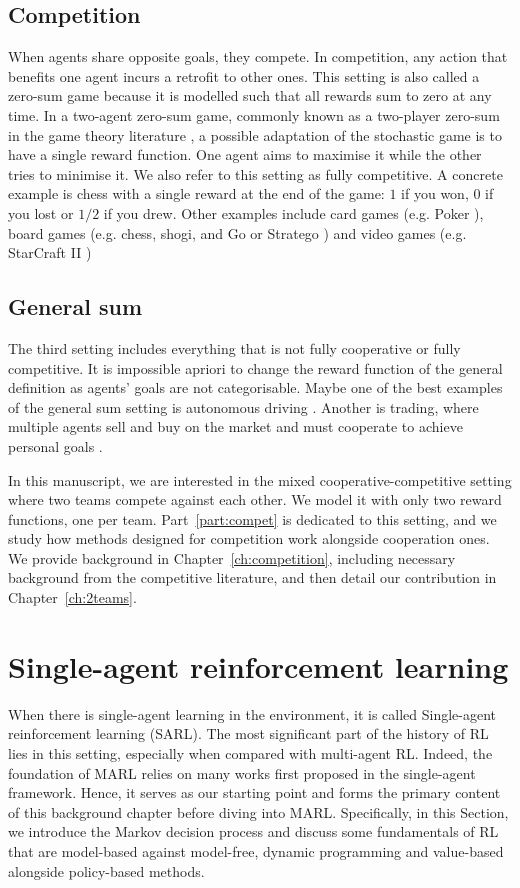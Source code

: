 \subsection{Competition} 
\label{sec:ch2_Competition}
When agents share opposite goals, they compete.
In competition, any action that benefits one agent incurs a retrofit to other ones.
This setting is also called a zero-sum game \citep{marl-book} because it is modelled such that all rewards sum to zero at any time.
In a two-agent zero-sum game, commonly known as a two-player zero-sum in the game theory literature \citep{russel2010}, a possible adaptation of the stochastic game is to have a single reward function.
One agent aims to maximise it while the other tries to minimise it.
We also refer to this setting as fully competitive.
A concrete example is chess with a single reward at the end of the game: $1$ if you won, $0$ if you lost or $1/2$ if you drew.
Other examples include card games (e.g. Poker \citep{poker}), board games (e.g. chess, shogi, and Go \citep{silver2018general} or Stratego \citep{stratego}) and video games (e.g. StarCraft II \citep{vinyals2019grandmaster})


\subsection{General sum} 
\label{sec:ch2_general_sum}
The third setting includes everything that is not fully cooperative or fully competitive.
It is impossible apriori to change the reward function of the general definition as agents' goals are not categorisable.
Maybe one of the best examples of the general sum setting is autonomous driving \citep{dinneweth2022multi}.
Another is trading, where multiple agents sell and buy on the market and must cooperate to achieve personal goals \citep{SHAVANDI2022118124}.

In this manuscript, we are interested in the mixed cooperative-competitive setting where two teams compete against each other.
We model it with only two reward functions, one per team.
Part~\ref{part:compet} is dedicated to this setting, and we study how methods designed for competition work alongside cooperation ones.
We provide background in Chapter~\ref{ch:competition}, including necessary background from the competitive literature, and then detail our contribution in Chapter~\ref{ch:2teams}.

\section{Single-agent reinforcement learning} 
\label{sec:ch2_single_agent_RL}
When there is single-agent learning in the environment, it is called Single-agent reinforcement learning (SARL).
The most significant part of the history of RL lies in this setting, especially when compared with multi-agent RL.
Indeed, the foundation of MARL relies on many works first proposed in the single-agent framework.
Hence, it serves as our starting point and forms the primary content of this background chapter before diving into MARL.
Specifically, in this Section, we introduce the Markov decision process and discuss some fundamentals of RL that are model-based against model-free, dynamic programming and value-based alongside policy-based methods.

